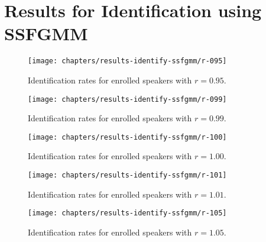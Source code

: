 \chapter{Results for Identification using SSFGMM}
\label{apx:results-identify-ssfgmm}



\begin{figure}[ht]
	\centering
	\texttt{[image: chapters/results-identify-ssfgmm/r-095]}
	\caption{Identification rates for enrolled speakers with $r = 0.95$.}
	\label{fig:r-095}
\end{figure}

\newpage


\begin{figure}[ht]
	\centering
	\texttt{[image: chapters/results-identify-ssfgmm/r-099]}
	\caption{Identification rates for enrolled speakers with $r = 0.99$.}
	\label{fig:r-099}
\end{figure}

\newpage


\begin{figure}[ht]
	\centering
	\texttt{[image: chapters/results-identify-ssfgmm/r-100]}
	\caption{Identification rates for enrolled speakers with $r = 1.00$.}
	\label{fig:r-100}
\end{figure}

\newpage


\begin{figure}[ht]
	\centering
	\texttt{[image: chapters/results-identify-ssfgmm/r-101]}
	\caption{Identification rates for enrolled speakers with $r = 1.01$.}
	\label{fig:r-101}
\end{figure}

\newpage


\begin{figure}[ht]
	\centering
	\texttt{[image: chapters/results-identify-ssfgmm/r-105]}
	\caption{Identification rates for enrolled speakers with $r = 1.05$.}
	\label{fig:r-105}
\end{figure}
